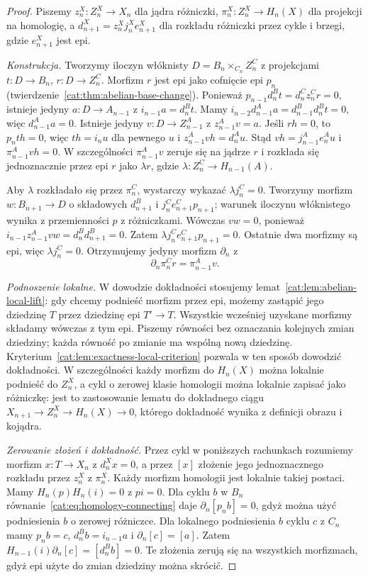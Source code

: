 \begin{proof}
Piszemy $z_n^X:Z_n^X\to X_n$ dla jądra różniczki, $\pi_n^X:Z_n^X\to H_n(X)$ dla projekcji na homologię, a $d_{n+1}^X=z_n^X j_n^X e_{n+1}^X$ dla rozkładu różniczki przez cykle i brzegi, gdzie $e_{n+1}^X$ jest epi.

\emph{Konstrukcja.}
Tworzymy iloczyn włóknisty $D=B_n\times_{C_n} Z_n^C$ z projekcjami $t:D\to B_n$, $r:D\to Z_n^C$. Morfizm $r$ jest epi jako cofnięcie epi $p_n$ (twierdzenie~\ref{cat:thm:abelian-base-change}). Ponieważ $p_{n-1}d_n^Bt=d_n^Cz_n^Cr=0$, istnieje jedyny $a:D\to A_{n-1}$ z $i_{n-1}a=d_n^Bt$. Mamy $i_{n-2}d_{n-1}^Aa=d_{n-1}^Bd_n^Bt=0$, więc $d_{n-1}^Aa=0$. Istnieje jedyny $v:D\to Z_{n-1}^A$ z $z_{n-1}^Av=a$. Jeśli $rh=0$, to $p_nth=0$, więc $th=i_nu$ dla pewnego $u$ i $z_{n-1}^Avh=d_n^Au$. Stąd $vh=j_{n-1}^Ae_n^Au$ i $\pi_{n-1}^Avh=0$. W szczególności $\pi_{n-1}^Av$ zeruje się na jądrze $r$ i rozkłada się jednoznacznie przez epi $r$ jako $\lambda r$, gdzie $\lambda:Z_n^C\to H_{n-1}(A)$.

Aby $\lambda$ rozkładało się przez $\pi_n^C$, wystarczy wykazać $\lambda j_n^C=0$. Tworzymy morfizm $w:B_{n+1}\to D$ o składowych $d_{n+1}^B$ i $j_n^C e_{n+1}^C p_{n+1}$; warunek iloczynu włóknistego wynika z przemienności $p$ z różniczkami. Wówczas $vw=0$, ponieważ $i_{n-1}z_{n-1}^Avw=d_n^Bd_{n+1}^B=0$. Zatem $\lambda j_n^C e_{n+1}^C p_{n+1}=0$. Ostatnie dwa morfizmy są epi, więc $\lambda j_n^C=0$. Otrzymujemy jedyny morfizm $\partial_n$ z
\begin{equation}\label{cat:eq:homology-connecting}
 \partial_n\pi_n^Cr=\pi_{n-1}^Av.
\end{equation}

\emph{Podnoszenie lokalne.}
W dowodzie dokładności stosujemy lemat~\ref{cat:lem:abelian-local-lift}: gdy chcemy podnieść morfizm przez epi, możemy zastąpić jego dziedzinę $T$ przez dziedzinę epi $T'\to T$. Wszystkie wcześniej uzyskane morfizmy składamy wówczas z tym epi. Piszemy równości bez oznaczania kolejnych zmian dziedziny; każda równość po zmianie ma wspólną nową dziedzinę. Kryterium~\ref{cat:lem:exactness-local-criterion} pozwala w ten sposób dowodzić dokładności. W szczególności każdy morfizm do $H_n(X)$ można lokalnie podnieść do $Z_n^X$, a cykl o zerowej klasie homologii można lokalnie zapisać jako różniczkę: jest to zastosowanie lematu do dokładnego ciągu $X_{n+1}\to Z_n^X\to H_n(X)\to0$, którego dokładność wynika z definicji obrazu i kojądra.

\emph{Zerowanie złożeń i dokładność.}
Przez cykl w poniższych rachunkach rozumiemy morfizm $x:T\to X_n$ z $d_n^Xx=0$, a przez $[x]$ złożenie jego jednoznacznego rozkładu przez $z_n^X$ z $\pi_n^X$. Każdy morfizm homologii jest lokalnie takiej postaci. Mamy $H_n(p)H_n(i)=0$ z $pi=0$. Dla cyklu $b$ w $B_n$ równanie~\eqref{cat:eq:homology-connecting} daje $\partial_n[p_nb]=0$, gdyż można użyć podniesienia $b$ o zerowej różniczce. Dla lokalnego podniesienia $b$ cyklu $c$ z $C_n$ mamy $p_nb=c$, $d_n^Bb=i_{n-1}a$ i $\partial_n[c]=[a]$. Zatem $H_{n-1}(i)\partial_n[c]=[d_n^Bb]=0$. Te złożenia zerują się na wszystkich morfizmach, gdyż epi użyte do zmian dziedziny można skrócić.


\end{proof}
